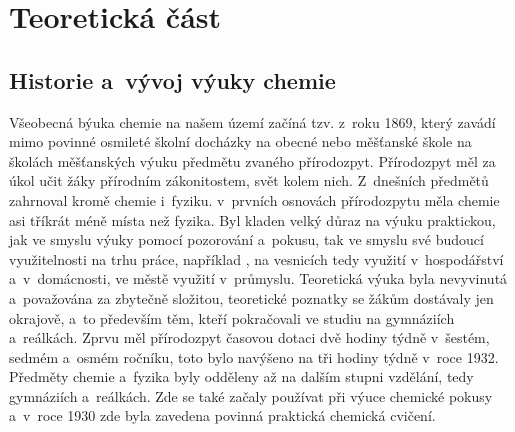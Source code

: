 \chapter{Teoretická část}

\section{Historie a~vývoj výuky chemie}

Všeobecná býuka chemie na našem území začíná tzv.  z~roku 1869, který zavádí mimo povinné osmileté školní docházky na obecné nebo měšťanské škole na školách měšťanských výuku předmětu zvaného přírodozpyt. Přírodozpyt měl za úkol učit žáky přírodním zákonitostem,  svět kolem nich. Z~dnešních předmětů zahrnoval kromě chemie i~fyziku. v~prvních osnovách přírodozpytu měla chemie asi tříkrát méně místa než fyzika. Byl kladen velký důraz na výuku praktickou, jak ve smyslu výuky pomocí pozorování a~pokusu, tak ve smyslu své budoucí využitelnosti na trhu práce, například , na vesnicích tedy využití v~hospodářství a~v~domácnosti, ve městě využití v~průmyslu. Teoretická výuka byla nevyvinutá a~považována za zbytečně složitou, teoretické poznatky se žákům dostávaly jen okrajově, a~to především těm, kteří pokračovali ve studiu na gymnáziích a~reálkách. Zprvu měl přírodozpyt časovou dotaci dvě hodiny týdně v~šestém, sedmém a~osmém ročníku, toto bylo navýšeno na tři hodiny týdně v~roce 1932. \cite{prirodozpyt} Předměty chemie a~fyzika byly odděleny až na dalším stupni vzdělání, tedy gymnáziích a~reálkách. Zde se také začaly používat při výuce chemické pokusy a~v~roce 1930 zde byla zavedena povinná praktická chemická cvičení. \cite{historie_vyuky}

